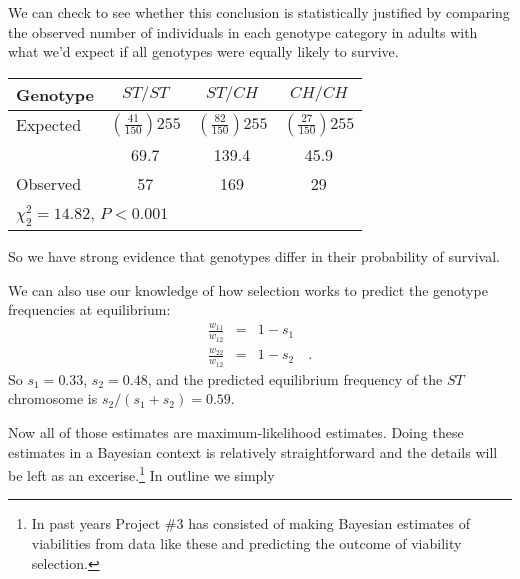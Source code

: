 We can check to see whether this conclusion is statistically justified
by comparing the observed number of individuals in each genotype
category in adults with what we'd expect if all genotypes were equally
likely to survive.
\begin{center}
\begin{tabular}{l|ccc}
\hline\hline
Genotype & $ST/ST$ & $ST/CH$ & $CH/CH$ \\
\hline
Expected & $\left(\frac{41}{150}\right)255$ &
  $\left(\frac{82}{150}\right)255$ & $\left(\frac{27}{150}\right)255$ \\
         & 69.7    & 139.4   & 45.9 \\
Observed & 57      & 169     & 29 \\
\hline
\multicolumn{4}{l}{$\chi^2_2 = 14.82$, $P < 0.001$}
\end{tabular}
\end{center}
So we have strong evidence that genotypes differ in their probability
of survival.

We can also use our knowledge of how selection works to predict the
genotype frequencies at equilibrium:
\begin{eqnarray*}
\frac{w_{11}}{w_{12}} &=& 1 - s_1 \\
\frac{w_{22}}{w_{12}} &=& 1 - s_2 \quad .
\end{eqnarray*}
So $s_1 = 0.33$, $s_2 = 0.48$, and the predicted equilibrium frequency
of the $ST$ chromosome is $s_2/(s_1+s_2) = 0.59$.

Now all of those estimates are maximum-likelihood estimates. Doing
these estimates in a Bayesian context is relatively straightforward
and the details will be left as an excerise.\footnote{In past years
  Project \#3 has consisted of making Bayesian estimates of
  viabilities from data like these and predicting the outcome of
  viability selection.} In outline we simply

